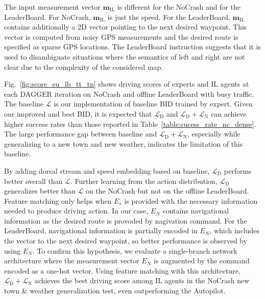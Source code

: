 The input measurement vector $\mathbf{m}_\text{IL}$ is different for the NoCrash and for the LeaderBoard. 
For NoCrash, $\mathbf{m}_\text{IL}$ is just the speed.
For the LeaderBoard, $\mathbf{m}_\text{IL}$ contains additionally a 2D vector pointing to the next desired waypoint.
This vector is computed from noisy GPS measurements and the desired route is specified as sparse GPS locations.
The LeaderBoard instruction suggests that it is used to disambiguate situations where the semantics of left and right are not clear due to the complexity of the considered map.


Fig.~\ref{fig:score_eu_lb_tt_tn} shows driving scores of experts and IL agents at each DAGGER iteration on NoCrash and offline LeaderBoard with busy traffic.
The baseline $\mathcal{L}$ is our implementation of baseline BID trained by expert. 
Given our improved and best BID, it is expected that $\mathcal{L}_\text{D}$ and $\mathcal{L}_\text{D} + \mathcal{L}_\text{N}$ can achieve higher success rates than those reported in Table~\ref{table:sucess_rate_nc_dense}.
The large performance gap between baseline and $\mathcal{L}_\text{D} + \mathcal{L}_\text{N}$, especially while generalizing to a new town and new weather, indicates the limitation of this baseline.


By adding dorsal stream and speed embedding based on baseline, $\mathcal{L}_\text{D}$ performs better overall than $\mathcal{L}$.
Further learning from the action distribution, $\mathcal{L}_\text{D}$ generalizes better than $\mathcal{L}$ on the NoCrash but not on the offline LeaderBoard.
Feature matching only helps when $E_s$ is provided with the necessary information needed to produce driving action.
In our case, $E_N$ contains navigational information as the desired route is provoded by nagivation command.
For the LeaderBoard, navigational information is partially encoded in $E_N$, which includes the vector to the next desired waypoint, so better performance is observed by using $E_N$.
To confirm this hypothesis, we evaluate a single-branch network architecture where the measurement vector $E_N$ is augmented by the command encoded as a one-hot vector.
Using feature matching with this architecture, $\mathcal{L}_\text{D} + \mathcal{L}_\text{N}$ achieves the best driving score among IL agents in the NoCrash new town \& weather generalization test, even outperforming the Autopilot.


